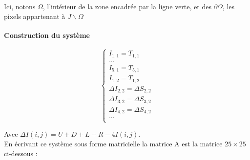 Ici, notons $\Omega$, l'intérieur de la zone encadrée par la ligne verte, et des $\partial \Omega$, les pixels appartenant à $J \backslash \Omega$


\paragraph{Construction du système}
\begin{center}
\begin{equation}
\left\{
\begin{aligned}
I_{1,1} = T_{1,1}\\
...\\
I_{5,1} = T_{5,1}\\
I_{1,2} = T_{1,2}\\
\Delta I_{2,2} = \Delta S_{2,2}\\
\Delta I_{3,2} = \Delta S_{3,2}\\
\Delta I_{4,2} = \Delta S_{4,2}\\
...\\
\end{aligned}
\right.
\end{equation}
\end{center}
\newpage
Avec $\Delta I(i,j) = U+D+L+R-4I(i,j)$.\\
En écrivant ce système sous forme matricielle la matrice A est la matrice $25\times 25$ ci-dessous :  


